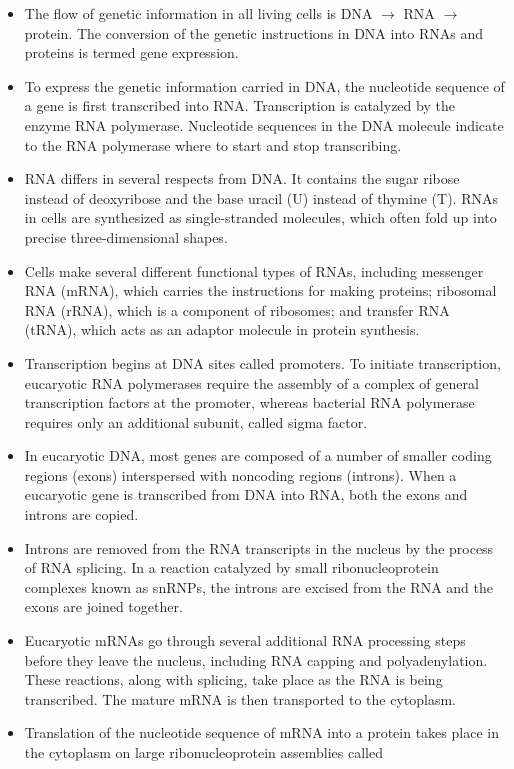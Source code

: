 \begin{itemize}
\item The flow of genetic information in all living cells is DNA $\rightarrow$ RNA $\rightarrow$
protein. The conversion of the genetic instructions in DNA into RNAs
and proteins is termed gene expression.
\item To express the genetic information carried in DNA, the nucleotide
sequence of a gene is first transcribed into RNA. Transcription is catalyzed by the enzyme RNA polymerase. Nucleotide sequences in the
DNA molecule indicate to the RNA polymerase where to start and
stop transcribing.
\item RNA differs in several respects from DNA. It contains the sugar ribose
instead of deoxyribose and the base uracil (U) instead of thymine (T).
RNAs in cells are synthesized as single-stranded molecules, which
often fold up into precise three-dimensional shapes.
\item Cells make several different functional types of RNAs, including
messenger RNA (mRNA), which carries the instructions for making
proteins; ribosomal RNA (rRNA), which is a component of ribosomes;
and transfer RNA (tRNA), which acts as an adaptor molecule in protein synthesis.
\item Transcription begins at DNA sites called promoters. To initiate transcription,
eucaryotic RNA polymerases require the assembly of a
complex of general transcription factors at the promoter, whereas
bacterial RNA polymerase requires only an additional subunit, called
sigma factor.
\item In eucaryotic DNA, most genes are composed of a number of smaller
coding regions (exons) interspersed with noncoding regions (introns).
When a eucaryotic gene is transcribed from DNA into RNA, both the
exons and introns are copied.
\item Introns are removed from the RNA transcripts in the nucleus by the
process of RNA splicing. In a reaction catalyzed by small ribonucleoprotein
complexes known as snRNPs, the introns are excised from
the RNA and the exons are joined together.
\item Eucaryotic mRNAs go through several additional RNA processing
steps before they leave the nucleus, including RNA capping and polyadenylation.
These reactions, along with splicing, take place as the
RNA is being transcribed. The mature mRNA is then transported to
the cytoplasm.
\item Translation of the nucleotide sequence of mRNA into a protein takes
place in the cytoplasm on large ribonucleoprotein assemblies called

\end{itemize}
